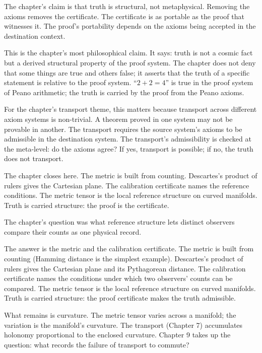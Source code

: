 The chapter's claim is that truth is structural, not metaphysical.
Removing the axioms removes the certificate. The certificate is
as portable as the proof that witnesses it. The proof's
portability depends on the axioms being accepted in the destination
context.

This is the chapter's most philosophical claim. It says: truth
is not a cosmic fact but a derived structural property of the
proof system. The chapter does not deny that some things are
true and others false; it asserts that the truth of a specific
statement is relative to the proof system. ``$2 + 2 = 4$'' is
true in the proof system of Peano arithmetic; the truth is
carried by the proof from the Peano axioms.

For the chapter's transport theme, this matters because
transport across different axiom systems is non-trivial. A
theorem proved in one system may not be provable in another.
The transport requires the source system's axioms to be
admissible in the destination system. The transport's
admissibility is checked at the meta-level: do the axioms
agree? If yes, transport is possible; if no, the truth does
not transport.

The chapter closes here. The metric is built from counting.
Descartes's product of rulers gives the Cartesian plane. The
calibration certificate names the reference conditions. The
metric tensor is the local reference structure on curved
manifolds. Truth is carried structure: the proof is the
certificate.

\begin{bridge}

The chapter's question was what reference structure lets distinct
observers compare their counts as one physical record.

The answer is the metric and the calibration certificate. The
metric is built from counting (Hamming distance is the simplest
example). Descartes's product of rulers gives the Cartesian
plane and its Pythagorean distance. The calibration certificate
names the conditions under which two observers' counts can be
compared. The metric tensor is the local reference structure on
curved manifolds. Truth is carried structure: the proof
certificate makes the truth admissible.

What remains is curvature. The metric tensor varies across a
manifold; the variation is the manifold's curvature. The
transport (Chapter 7) accumulates holonomy proportional to the
enclosed curvature. Chapter 9 takes up the question: what
records the failure of transport to commute?

\end{bridge}

